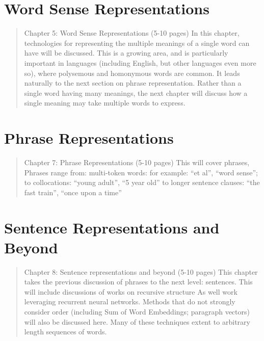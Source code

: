 \documentclass[12pt,parskip]{komatufte}
\begin{document}





\chapter{Word Sense Representations}\label{sec:word-sense-representations}
\begin{abstract}
Chapter 5: Word Sense Representations (5-10 pages)
In this chapter, technologies for representing the multiple meanings of a single word can have will be discussed.
This is a growing area, and is particularly important in languages (including English, but other languages even more so), where polysemous and homonymous words are common.
It leads naturally to the next section on phrase representation. Rather than a single word having many meanings, the next chapter will discuss how a single meaning may take multiple words to express.
\end{abstract}

\chapter{Phrase Representations}\label{sec:phrase-representations}
\begin{abstract}
Chapter 7: Phrase Representations (5-10 pages)
This will cover phrases, 
Phrases range from:
multi-token words: for example: “et al”, “word sense”;
to collocations: “young adult”, “5 year old”
to longer sentence clauses: “the fast train”, “once upon a time”
\end{abstract}

\chapter{Sentence Representations and Beyond}\label{sec:sentence-representations-and-beyond}
\begin{abstract}
Chapter 8: Sentence representations and beyond (5-10 pages)
This chapter takes the previous discussion of phrases to the next level: sentences.
This will include discussions of works on recursive structure
As well work leveraging recurrent neural networks.
Methods that do not strongly consider order (including Sum of Word Embeddings; paragraph vectors) will also be discussed here.
Many of these techniques extent to arbitrary length sequences of words.
\end{abstract}
\end{document}
